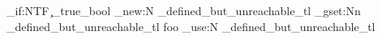 \bool_if:NTF
  \c_true_bool
  {
    \tl_new:N  %
      \g_defined_but_unreachable_tl
    \tl_gset:Nn
      \g_defined_but_unreachable_tl
      { foo }
  }
  {
    \tl_use:N
      \g_defined_but_unreachable_tl
  }
